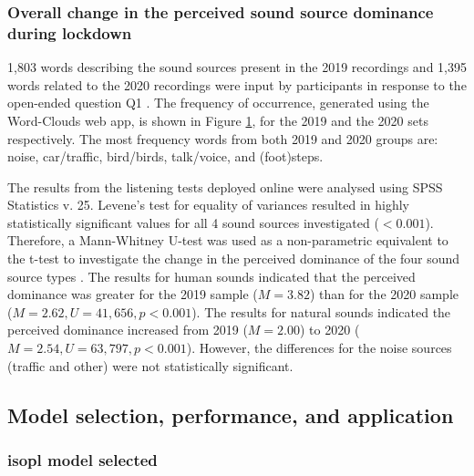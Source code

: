    \subsubsection{Overall change in the perceived sound source dominance during lockdown}

   1,803 words describing the sound sources present in the 2019 recordings and 1,395 words related to the 2020 recordings were input by participants in response to the open-ended question Q1 . The frequency of occurrence, generated using the Word-Clouds web app, is shown in Figure \cref{fig:wordclouds}, for the 2019 and the 2020 sets respectively. The most frequency words from both 2019 and 2020 groups are: noise, car/traffic, bird/birds, talk/voice, and (foot)steps.

   \begin{figure}
     \caption{\label{fig:wordclouds}}
   \end{figure}

   The results from the listening tests deployed online were analysed using SPSS Statistics v. 25. Levene's test for equality of variances resulted in highly statistically significant values for all 4 sound sources investigated ($<0.001$). Therefore, a Mann-Whitney U-test was used as a non-parametric equivalent to the t-test to investigate the change in the perceived dominance of the four sound source types \citep{McKnight2010Mann}. The results for human sounds indicated that the perceived dominance was greater for the 2019 sample ($M=3.82$) than for the 2020 sample ($M=2.62, U=41,656, p<0.001$). The results for natural sounds indicated the perceived dominance increased from 2019 ($M=2.00$) to 2020 ($M=2.54, U=63,797, p<0.001$). However, the differences for the noise sources (traffic and other) were not statistically significant.

   \begin{figure}[h]
     \caption{\label{tab:source-dominance-stats}}
   \end{figure}

 \subsection{Model selection, performance, and application}

   \subsubsection{\gls{isopl} model selected}

